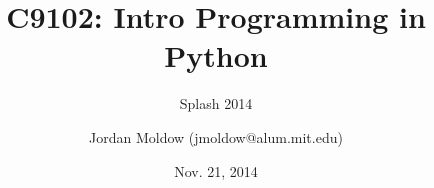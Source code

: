 \usepackage[english]{babel}

\usepackage[latin1]{inputenc}

\usepackage{times}
\usepackage[T1]{fontenc}
\usepackage{amsmath,amssymb,amsfonts}

\usepackage{textcomp, inputenc}
\renewcommand{\ttdefault}{pcr}

\renewcommand{\subject}{C9102: Intro Programming in Python}
\title %
{\subject}


\subtitle
{%
  Splash 2014%
}

\author %
{Jordan Moldow ({\ttfamily jmoldow@alum.mit.edu})
}


\date %
{Nov. 21, 2014}













\maketitle
\begin{frame}
  \titlepage
\end{frame}

